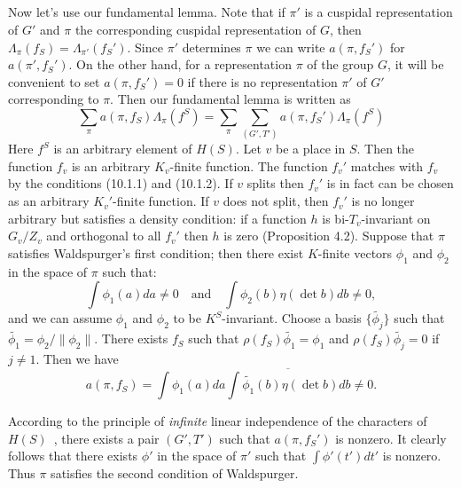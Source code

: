 \subsection{}
Now let's use our fundamental lemma.
Note that if $\pi'$ is a cuspidal representation of $G'$ and $\pi$ the corresponding cuspidal representation of $G$, then $\Lambda_\pi(f_S) = \Lambda_{\pi'}( f_{S}')$.
Since $\pi'$ determines $\pi$ we can write $a(\pi, f_S')$ for $a(\pi', f_S')$.
On the other hand, for a representation $\pi$ of the group $G$, it will be convenient to set $a(\pi, f_S')=0$ if there is no representation $\pi'$ of $G'$ corresponding to $\pi$.
Then our fundamental lemma is written as
\begin{equation}
    \label{eqn:11.4.1}
    \sum_{\pi} a(\pi, f_S)\Lambda_{\pi}(f^S) = \sum_{\pi} \sum_{(G', T')} a(\pi, f_S') \Lambda_{\pi}(f^S)
\end{equation}
Here $f^S$ is an arbitrary element of $H(S)$.
Let $v$ be a place in $S$.
Then the function $f_v$ is an arbitrary $K_v$-finite function.
The function $f_v'$ matches with $f_v$ by the conditions (10.1.1) and (10.1.2).
If $v$ splits then $f_v'$ is in fact can be chosen as an arbitrary $K_v'$-finite function.
If $v$ does not split, then $f_v'$ is no longer arbitrary but satisfies a density condition: if a function $h$ is bi-$T_v$-invariant on $G_v/Z_v$ and orthogonal to all $f_v'$ then $h$ is zero (Proposition 4.2).
Suppose that $\pi$ satisfies Waldspurger's first condition; then there exist $K$-finite vectors $\phi_1$ and $\phi_2$ in the space of $\pi$ such that:
\begin{equation*}
    \int \phi_1(a)da \neq 0 \quad \text{and}\quad \int \phi_2(b) \eta(\det b) db \neq 0,
\end{equation*}
and we can assume $\phi_1$ and $\phi_2$ to be $K^S$-invariant.
Choose a basis $\{\widetilde{\phi_j}\}$ such that $\widetilde{\phi_1} = \phi_2 / \|\phi_2\|$.
There exists $f_S$ such that $\rho(f_S)\widetilde{\phi_1} = \phi_1$ and $\rho(f_S) \widetilde{\phi_j} = 0$ if $j\neq 1$.
Then we have
\begin{equation*}
    a(\pi, f_S) = \int \phi_1(a) da  \overline{\int \widetilde{\phi_1}(b) \eta(\det b)db}\neq 0.
\end{equation*}

According to the principle of \emph{infinite} linear independence of the characters of $H(S)$~\cite{langlands1980base}, 
there exists a pair $(G', T')$ such that $a(\pi, f_S')$ is nonzero.
It clearly follows that there exists $\phi'$ in the space of $\pi'$ such that $\int \phi'(t') dt'$ is nonzero.
Thus $\pi$ satisfies the second condition of Waldspurger.

